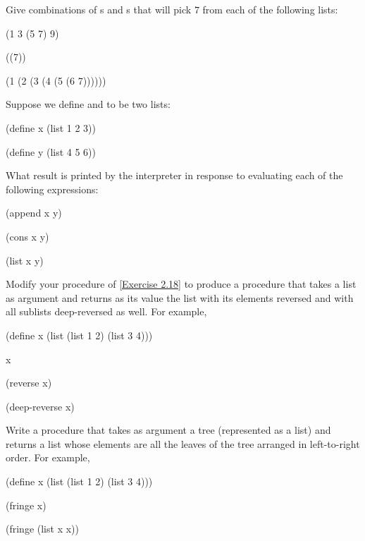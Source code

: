 \begin{exercise}
	\label{Exercise 2.25}
	Give combinations of s and s that will pick \( 7 \) from each of the following lists:
	\begin{scheme}
	  (1 3 (5 7) 9)

	  ((7))

	  (1 (2 (3 (4 (5 (6 7))))))
	\end{scheme}
\end{exercise}



\begin{exercise}
	\label{Exercise 2.26}
	Suppose we define  and  to be two lists:
	\begin{scheme}
	  (define x (list 1 2 3))

	  (define y (list 4 5 6))
	\end{scheme}
	What result is printed by the interpreter in response to evaluating each of the
	following expressions:
	\begin{scheme}
	  (append x y)

	  (cons x y)

	  (list x y)
	\end{scheme}
\end{exercise}



\begin{exercise}
	\label{Exercise 2.27}
	Modify your  procedure of \cref{Exercise 2.18} to produce a  procedure that takes a list as argument and returns as its value the list with its elements reversed and with all sublists deep-reversed as well.
	For example,
	\begin{scheme}
	  (define x (list (list 1 2) (list 3 4)))

	  x
	  ~~

	  (reverse x)
	  ~~

	  (deep-reverse x)
	  ~~
	\end{scheme}
\end{exercise}



\begin{exercise}
	\label{Exercise 2.28}
	Write a procedure  that takes as argument a tree (represented as a list) and returns a list whose elements are all the leaves of the tree arranged in left-to-right order.
	For example,
	\begin{scheme}
	  (define x (list (list 1 2) (list 3 4)))

	  (fringe x)
	  ~\outprint{(1 2 3 4)}~

	  (fringe (list x x))
	  ~\outprint{(1 2 3 4 1 2 3 4)}~
	\end{scheme}
\end{exercise}



